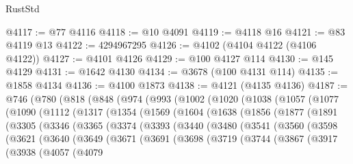 \begin{lexlean}{RustStd}
\begin{coremodule}
@4117 := @77 @4116
@4118 := @10 @4091
@4119 := @4118 @16
@4121 := @83 @4119 @13
@4122 := 4294967295
@4126 := @4102 (@4104 @4122 (@4106 @4122))
@4127 := @4101 @4126
@4129 := @100 @4127 @114
@4130 := @145 @4129
@4131 := @1642 @4130
@4134 := @3678 (@100 @4131 @114)
@4135 := @1858 @4134
@4136 := @4100 @1873
@4138 := @4121 (@4135 @4136)
@4187 := @746
    (@780
      (@818
        (@848
          (@974
            (@993
              (@1002
                (@1020
                  (@1038
                    (@1057
                      (@1077
                        (@1090
                          (@1112
                            (@1317
                              (@1354
                                (@1569
                                  (@1604
                                    (@1638
                                      (@1856
                                        (@1877
                                          (@1891
                                            (@3305
                                              (@3346
                                                (@3365
                                                  (@3374
                                                    (@3393
                                                      (@3440
                                                        (@3480
                                                          (@3541
                                                            (@3560
                                                              (@3598
                                                                (@3621
                                                                  (@3640
                                                                    (@3649
                                                                      (@3671
                                                                        (@3691
                                                                          (@3698
                                                                            (@3719
                                                                              (@3744
                                                                                (@3867
                                                                                  (@3917
                                                                                    (@3938
                                                                                      (@4057
                                                                                        (@4079

\end{coremodule}
\end{lexlean}
